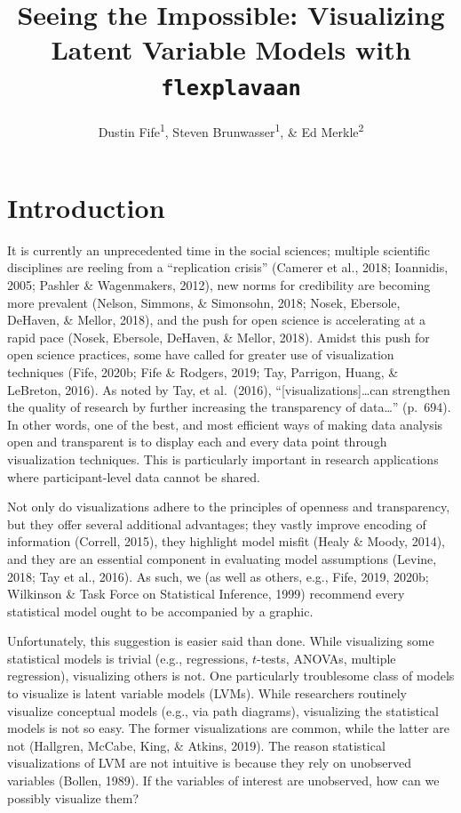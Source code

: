 \documentclass[
  english,
  doc]{apa6}
\title{Seeing the Impossible: Visualizing Latent Variable Models with \texttt{flexplavaan}}
\author{Dustin Fife\textsuperscript{1}, Steven Brunwasser\textsuperscript{1}, \& Ed Merkle\textsuperscript{2}}
\date{}
\affiliation{\vspace{0.5cm}\textsuperscript{1} Rowan University\\\textsuperscript{2} University of Missouri}
\begin{document}
\maketitle

\hypertarget{introduction}{%
\section{Introduction}\label{introduction}}

It is currently an unprecedented time in the social sciences; multiple scientific disciplines are reeling from a ``replication crisis'' (Camerer et al., 2018; Ioannidis, 2005; Pashler \& Wagenmakers, 2012), new norms for credibility are becoming more prevalent (Nelson, Simmons, \& Simonsohn, 2018; Nosek, Ebersole, DeHaven, \& Mellor, 2018), and the push for open science is accelerating at a rapid pace (Nosek, Ebersole, DeHaven, \& Mellor, 2018). Amidst this push for open science practices, some have called for greater use of visualization techniques (Fife, 2020b; Fife \& Rodgers, 2019; Tay, Parrigon, Huang, \& LeBreton, 2016). As noted by Tay, et al.~(2016), ``{[}visualizations{]}\ldots can strengthen the quality of research by further increasing the transparency of data\ldots{}'' (p.~694). In other words, one of the best, and most efficient ways of making data analysis open and transparent is to display each and every data point through visualization techniques. This is particularly important in research applications where participant-level data cannot be shared.

Not only do visualizations adhere to the principles of openness and transparency, but they offer several additional advantages; they vastly improve encoding of information (Correll, 2015), they highlight model misfit (Healy \& Moody, 2014), and they are an essential component in evaluating model assumptions (Levine, 2018; Tay et al., 2016). As such, we (as well as others, e.g., Fife, 2019, 2020b; Wilkinson \& Task Force on Statistical Inference, 1999) recommend every statistical model ought to be accompanied by a graphic.

Unfortunately, this suggestion is easier said than done. While visualizing some statistical models is trivial (e.g., regressions, \(t\)-tests, ANOVAs, multiple regression), visualizing others is not. One particularly troublesome class of models to visualize is latent variable models (LVMs). While researchers routinely visualize conceptual models (e.g., via path diagrams), visualizing the statistical models is not so easy. The former visualizations are common, while the latter are not (Hallgren, McCabe, King, \& Atkins, 2019). The reason statistical visualizations of LVM are not intuitive is because they rely on unobserved variables (Bollen, 1989). If the variables of interest are unobserved, how can we possibly visualize them?
\end{document}
